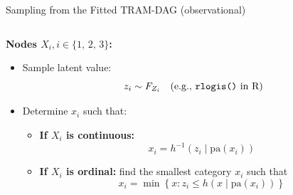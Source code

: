 \documentclass[onlytextwidth,english]{beamer}\usepackage[]{graphicx}\usepackage[]{xcolor}
\begin{document}
\begin{frame}{Sampling from the Fitted TRAM-DAG (observational)}

\begin{columns}

\begin{column}{0.65\textwidth}

\textbf{Nodes $X_i , i \in \{1,\, 2,\, 3\}$:}

\vspace{0.2cm}

\begin{itemize}
    \item Sample latent value: 
    \[
    z_i \sim F_{Z_i} \quad \text{(e.g., \texttt{rlogis()} in R)}
    \]

    \item Determine \(x_i\) such that:

    \begin{itemize}
        \item \textbf{If \(X_i\) is continuous:}
        \[
        x_i = h^{-1}(z_i \mid \text{pa}(x_i))
        \]
        
        \item \textbf{If \(X_i\) is ordinal:}
        find the smallest category $x_i$ such that
        \[
        x_i = \min \left\{ x : z_i \le h(x \mid \text{pa}(x_i)) \right\}
        \]
    \end{itemize}
\end{itemize}

\end{column}


\end{columns}
\end{frame}
\end{document}
